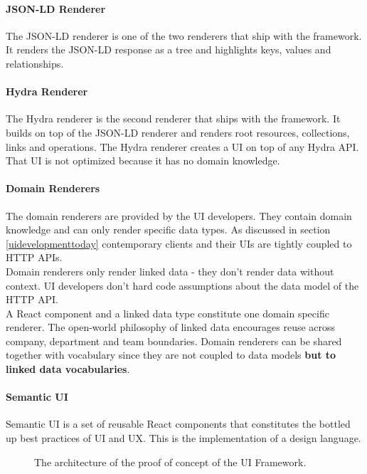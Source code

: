 \paragraph{JSON-LD Renderer}
The JSON-LD renderer is one of the two renderers that ship with the framework. It renders the JSON-LD response as a tree and highlights keys, values and relationships.

\paragraph{Hydra Renderer}
The Hydra renderer is the second renderer that ships with the framework. It builds on top of the JSON-LD renderer and renders root resources, collections, links and operations. The Hydra renderer creates a UI on top of any Hydra API. That UI is not optimized because it has no domain knowledge.

\paragraph{Domain Renderers}
The domain renderers are provided by the UI developers. They contain domain knowledge and can only render specific data types. As discussed in section \ref{uidevelopmenttoday} contemporary clients and their UIs are tightly coupled to HTTP APIs. \\
Domain renderers only render linked data - they don't render data without context. UI developers don't hard code assumptions about the data model of the HTTP API. \\
A React component and a linked data type constitute one domain specific renderer. The open-world philosophy of linked data encourages reuse across company, department and team boundaries. Domain renderers can be shared together with vocabulary since they are not coupled to data models \textbf{but to linked data vocabularies}.

\paragraph{Semantic UI}
Semantic UI is a set of reusable React components that constitutes the bottled up best practices of UI and UX. This is the implementation of a design language.

\begin{figure}[!htb]
  \caption{The architecture of the proof of concept of the UI Framework.}
\end{figure}

